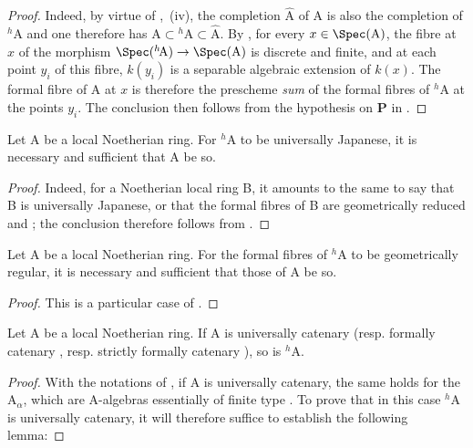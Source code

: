 \begin{proof}
Indeed, by virtue of ,~(iv), the completion $\hat{\mathrm{A}}$ of A is also the completion of ${}^h\!\mathrm{A}$ and one therefore has $\mathrm{A}\subset{}^h\!\mathrm{A}\subset\hat{\mathrm{A}}$.
By , for every $x\in\Spec(\mathrm{A})$, the fibre at $x$ of the morphism $\Spec({}^h\!\mathrm{A})\to\Spec(\mathrm{A})$ is discrete and finite, and at each point $y_i$ of this fibre, $k(y_i)$ is a separable algebraic extension of $k(x)$.
The formal fibre of A at $x$ is therefore the prescheme \emph{sum} of the formal fibres of ${}^h\!\mathrm{A}$ at the points $y_i$.
The conclusion then follows from the hypothesis on $\boldsymbol{P}$ in .
\end{proof}

\begin{corollary}[18.7.3]
\label{IV.18.7.3}
Let $\mathrm{A}$ be a local Noetherian ring.
For ${}^h\!\mathrm{A}$ to be universally Japanese, it is necessary and sufficient that A be so.
\end{corollary}

\begin{proof}
Indeed, for a Noetherian local ring B, it amounts to the same to say that B is universally Japanese, or that the formal fibres of B are geometrically reduced  and ;
the conclusion therefore follows from .
\end{proof}

\begin{corollary}[18.7.4]
\label{IV.18.7.4}
Let $\mathrm{A}$ be a local Noetherian ring.
For the formal fibres of ${}^h\!\mathrm{A}$ to be geometrically regular, it is necessary and sufficient that those of A be so.
\end{corollary}

\begin{proof}
This is a particular case of .
\end{proof}

\begin{proposition}[18.7.5]
\label{IV.18.7.5}
Let $\mathrm{A}$ be a local Noetherian ring.
If A is universally catenary  (resp. formally catenary , resp. strictly formally catenary ), so is ${}^h\!\mathrm{A}$.
\end{proposition}

\begin{proof}
With the notations of , if A is universally catenary, the same holds for the $\mathrm{A}_\alpha$, which are A-algebras essentially of finite type .
To prove that in this case ${}^h\!\mathrm{A}$ is universally catenary, it will therefore suffice to establish the following lemma:
\end{proof}

